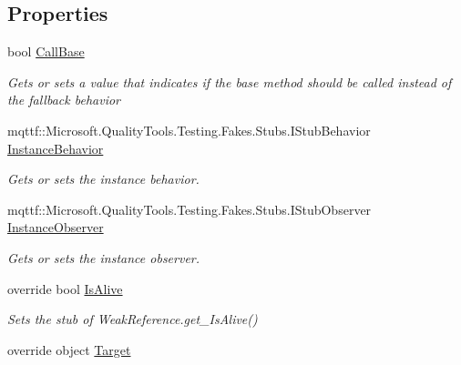\subsection*{Properties}
\begin{DoxyCompactItemize}
\item 
bool \hyperlink{class_system_1_1_fakes_1_1_stub_weak_reference_a5d9e112381b8ab3da48f3da56f5eb8aa}{Call\-Base}
\begin{DoxyCompactList}\small\item\em Gets or sets a value that indicates if the base method should be called instead of the fallback behavior\end{DoxyCompactList}\item 
mqttf\-::\-Microsoft.\-Quality\-Tools.\-Testing.\-Fakes.\-Stubs.\-I\-Stub\-Behavior \hyperlink{class_system_1_1_fakes_1_1_stub_weak_reference_ace05e025b4d43452e24d0622113eb7db}{Instance\-Behavior}
\begin{DoxyCompactList}\small\item\em Gets or sets the instance behavior.\end{DoxyCompactList}\item 
mqttf\-::\-Microsoft.\-Quality\-Tools.\-Testing.\-Fakes.\-Stubs.\-I\-Stub\-Observer \hyperlink{class_system_1_1_fakes_1_1_stub_weak_reference_aad7ec97e86533951d83a199be94c6781}{Instance\-Observer}
\begin{DoxyCompactList}\small\item\em Gets or sets the instance observer.\end{DoxyCompactList}\item 
override bool \hyperlink{class_system_1_1_fakes_1_1_stub_weak_reference_a5d903b837b56f157bd3b81c3a1dfd91e}{Is\-Alive}
\begin{DoxyCompactList}\small\item\em Sets the stub of Weak\-Reference.\-get\-\_\-\-Is\-Alive()\end{DoxyCompactList}\item 
override object \hyperlink{class_system_1_1_fakes_1_1_stub_weak_reference_a14eb3a1284e00ba40449b5547601c7f5}{Target}

\end{DoxyCompactItemize}
